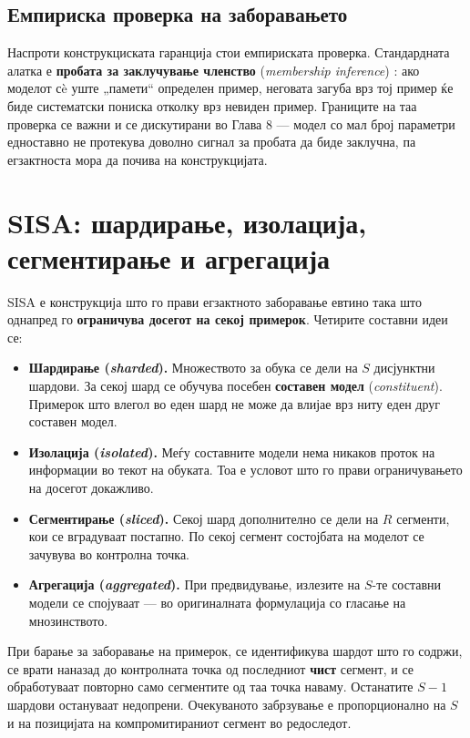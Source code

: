 \subsection{Емпириска проверка на заборавањето}

Наспроти конструкциската гаранција стои емпириската проверка. Стандардната алатка е
\textbf{пробата за заклучување членство} (\emph{membership inference}) \cite{shokri2017mia}: ако
моделот сè уште „памети“ определен пример, неговата загуба врз тој пример ќе биде
систематски пониска отколку врз невиден пример. Границите на таа проверка се важни и се
дискутирани во Глава 8 --- модел со мал број параметри едноставно не протекува доволно
сигнал за пробата да биде заклучна, па егзактноста мора да почива на конструкцијата.

\section{SISA: шардирање, изолација, сегментирање и агрегација}

SISA \cite{bourtoule2021sisa} е конструкција што го прави егзактното заборавање евтино така
што однапред го \textbf{ограничува досегот на секој примерок}. Четирите составни идеи се:

\begin{itemize}
  \item \textbf{Шардирање (\emph{sharded}).} Множеството за обука се дели на $S$ дисјунктни шардови. За секој шард се обучува посебен \textbf{составен модел} (\emph{constituent}). Примерок што влегол во еден шард не може да влијае врз ниту еден друг составен модел.
  \item \textbf{Изолација (\emph{isolated}).} Меѓу составните модели нема никаков проток на информации во текот на обуката. Тоа е условот што го прави ограничувањето на досегот докажливо.
  \item \textbf{Сегментирање (\emph{sliced}).} Секој шард дополнително се дели на $R$ сегменти, кои се вградуваат постапно. По секој сегмент состојбата на моделот се зачувува во контролна точка.
  \item \textbf{Агрегација (\emph{aggregated}).} При предвидување, излезите на $S$-те составни модели се спојуваат --- во оригиналната формулација со гласање на мнозинството.
\end{itemize}

При барање за заборавање на примерок, се идентификува шардот што го содржи, се врати
наназад до контролната точка од последниот \textbf{чист} сегмент, и се обработуваат повторно
само сегментите од таа точка наваму. Останатите $S-1$ шардови остануваат недопрени. Очекуваното
забрзување е пропорционално на $S$ и на позицијата на компромитираниот сегмент во редоследот.

